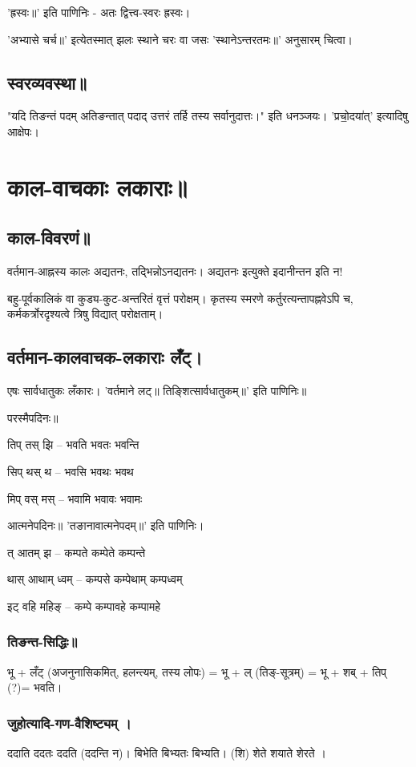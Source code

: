 \documentclass[oneside, article]{memoir}
\begin{document}
'ह्रस्वः॥' इति पाणिनिः - अतः द्वित्त्व-स्वरः ह्रस्वः।

'अभ्यासे चर्च॥' इत्येतस्मात् झलः स्थाने चरः वा जसः 'स्थानेऽन्तरतमः॥' अनुसारम् चित्वा।

\section{स्वरव्यवस्था॥}
"यदि तिङन्तं पदम् अतिङन्तात् पदाद् उत्तरं तर्हि तस्य सर्वानुदात्तः।" इति धनञ्जयः। 'प्रचो॒दया॑त्' इत्यादिषु आक्षेपः।

\chapter{काल-वाचकाः लकाराः॥}
\section{काल-विवरणं॥}
वर्तमान-आह्नस्य कालः अद्यतनः, तद्भिन्नोऽनद्यतनः। अद्यतनः इत्युक्ते इदानीन्तन इति न!

बहु-पूर्वकालिकं वा कुड्य-कुट-अन्तरितं वृत्तं परोक्षम्। कृतस्य स्मरणे कर्तुरत्यन्तापह्नवेऽपि च, कर्मकर्त्रोरदृश्यत्वे त्रिषु विद्यात् परोक्षताम्।

\section{वर्तमान-कालवाचक-लकाराः लँट्।}
एषः सार्वधातुकः लँकारः। 'वर्तमाने लट्॥ तिङ्शित्सार्वधातुकम्॥' इति पाणिनिः॥

परस्मैपदिनः॥

तिप् तस् झि – भवति भवतः भवन्ति

सिप् थस् थ – भवसि भवथः भवथ

मिप् वस् मस् – भवामि भवावः भवामः  

आत्मनेपदिनः॥ 'तङानावात्मनेपदम्॥' इति पाणिनिः।

त् आतम् झ – कम्पते कम्पेते कम्पन्ते

थास् आथाम् ध्वम् – कम्पसे कम्पेथाम् कम्पध्वम्

इट् वहि महिङ् – कम्पे कम्पावहे कम्पामहे

\subsection{तिङन्त-सिद्धिः॥}
भू + लँट्  (अजनुनासिकमित्, हलन्त्यम्, तस्य लोपः) = भू + ल् (तिङ्-सूत्रम्) = भू + शब् + तिप् (?)= भवति।  

\subsection{जुहोत्यादि-गण-वैशिष्ट्यम् ।}
ददाति ददतः ददति (ददन्ति न)। बिभेति बिभ्यतः बिभ्यति। (शि) शेते शयाते शेरते ।
\end{document}
